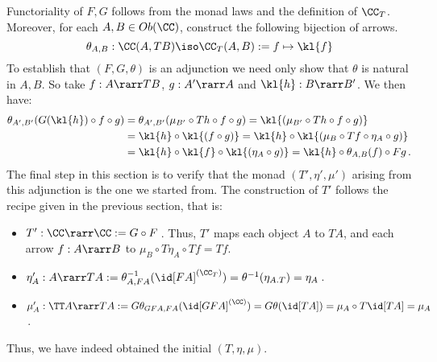 \documentclass[12pt]{article}
\begin{document}
Functoriality of $F,G$ follows from the monad laws and the definition of $\CC_T$.
Moreover, for each $A,B\in Ob(\CC)$, construct the following bijection of arrows.
\[ \theta_{A,B}:\CC(A,TB)\iso\CC_T(A,B):= f\mapsto\kl{f} \]
To establish that $(F,G,\theta)$ is an adjunction we need only show that $\theta$ is natural in $A,B$. So take $f:A\rarr TB$, $g:A'\rarr A$ and
$\kl{h}:B\rarr B'$. We then have:
\begin{align*}
  \theta_{A',B'}(G(\kl{h})\circ f\circ g) &= \theta_{A',B'}(\mu_{B'}\circ Th\circ f\circ g) = \kl{(\mu_{B'}\circ Th\circ f\circ g)} \\
    &= \kl{h}\circ\kl{(f\circ g)} = \kl{h}\circ\kl{(\mu_B\circ Tf\circ\eta_A\circ g)}\\
    &= \kl{h}\circ\kl{f}\circ\kl{(\eta_A\circ g)} = \kl{h}\circ\theta_{A,B}(f)\circ Fg\,.
\end{align*}
The final step in this section is to verify that the monad $(T',\eta',\mu')$ arising from this adjunction is the one we started from. The
construction of $T'$ follows the recipe given in the previous section, that is:
\begin{itemize}
  \item $T':\CC\rarr\CC:=G\circ F$\,. Thus, $T'$ maps each object $A$ to $TA$, and each arrow $f:A\rarr B$ to $\mu_B\circ T\eta_A\circ Tf=Tf$.
  \item $\eta'_A:A\rarr TA:=\theta_{A,FA}^{-1}(\id[FA]^{(\CC_T)})=\theta^{-1}(\eta_{A.T})=\eta_A$\,.
  \item $\mu'_A:\TT A\rarr TA:=G\theta_{GFA,FA}(\id[GFA]^{(\CC)})=G\theta(\id[TA])=\mu_A\circ T\id[TA]=\mu_A$\,.
\end{itemize}
Thus, we have indeed obtained the initial $(T,\eta,\mu)$.
\end{document}
